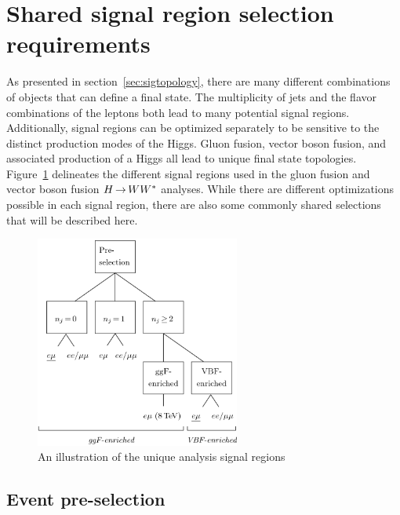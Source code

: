 \section{Shared signal region selection requirements}

As presented in section~\ref{sec:sigtopology}, there are many different combinations of objects that can define a \HWWfull final state. The multiplicity of jets and the flavor combinations of the leptons both lead to many potential signal regions. Additionally, signal regions can be optimized separately to be sensitive to the distinct production modes of the Higgs. Gluon fusion, vector boson fusion, and associated production of a Higgs all lead to unique final state topologies. Figure~\ref{fig:analysisregions} delineates the different signal regions used in the gluon fusion and vector boson fusion $H{\,{\rightarrow}\,}WW^\ast$ analyses. While there are different optimizations possible in each signal region, there are also some commonly shared selections that will be described here.

\begin{figure}[h!]
  \centering
  \captionsetup{justification=centering}

  \includegraphics[width=0.6\textwidth]{figures/analysis_regions}
  \caption{An illustration of the unique analysis signal regions\cite{WW2015}}
  \label{fig:analysisregions}
\end{figure}

\subsection{Event pre-selection}

